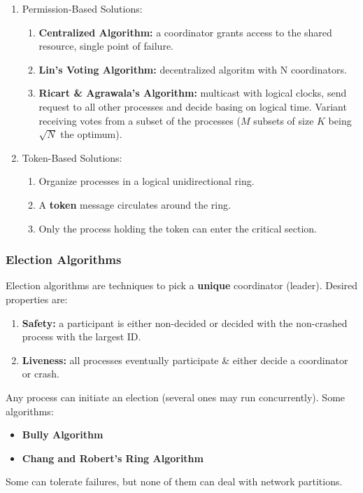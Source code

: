 \begin{enumerate}
    \item Permission-Based Solutions:
    \begin{enumerate}
        \item \textbf{Centralized Algorithm:} a coordinator grants access to the shared resource, single point of failure.
        \item \textbf{Lin's Voting Algorithm:} decentralized algoritm with N coordinators.
        \item \textbf{Ricart \& Agrawala's Algorithm:} multicast with logical clocks, send request to all other processes and decide basing on logical time.
            Variant receiving votes from a subset of the processes ($M$ subsets of size $K$ being $\sqrt{N}$ the optimum).
    \end{enumerate}
    \item Token-Based Solutions:
    \begin{enumerate}
        \item Organize processes in a logical unidirectional ring.
        \item A \textbf{token} message circulates around the ring.
        \item Only the process holding the token can enter the critical section.
    \end{enumerate}
\end{enumerate}
\subsubsection*{Election Algorithms}
Election algorithms are techniques to pick a \textbf{unique} coordinator (leader).
Desired properties are:
\begin{enumerate}
    \item \textbf{Safety:} a participant is either non-decided or decided with the non-crashed process with the largest ID.
    \item \textbf{Liveness:} all processes eventually participate \& either decide a coordinator or crash.
\end{enumerate}
Any process can initiate an election (several ones may run concurrently).
Some algorithms:
\begin{itemize}
    \item \textbf{Bully Algorithm}
    \item \textbf{Chang and Robert's Ring Algorithm}
\end{itemize}
Some can tolerate failures, but none of them can deal with network partitions.

